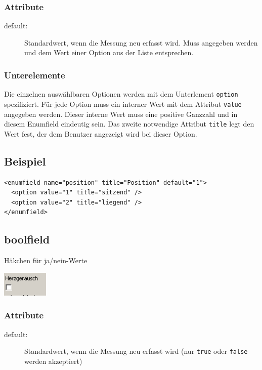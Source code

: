 \documentclass[a4paper]{scrartcl}
\begin{document}
\subsubsection{Attribute}
\begin{description}
    \item[default:] Standardwert, wenn die Messung neu erfasst wird. Muss
                    angegeben werden und dem Wert einer Option aus der Liste
                    entsprechen.
\end{description}
\subsubsection{Unterelemente}
Die einzelnen auswählbaren Optionen werden mit dem Unterlement \texttt{option}
spezifiziert. Für jede Option muss ein interner Wert mit dem Attribut
\texttt{value} angegeben werden. Dieser interne Wert muss eine positive Ganzzahl
und in diesem Enumfield eindeutig sein. Das zweite notwendige Attribut
\texttt{title} legt den Wert fest, der dem Benutzer angezeigt wird bei dieser
Option.
\subsection{Beispiel}
\begin{lstlisting}
<enumfield name="position" title="Position" default="1">
  <option value="1" title="sitzend" />
  <option value="2" title="liegend" />
</enumfield>
\end{lstlisting}


\subsection{boolfield}
Häkchen für ja/nein-Werte
\begin{center}
    \includegraphics[width=2.2cm]{images/boolfield.png}
\end{center}
\subsubsection{Attribute}
\begin{description}
    \item[default:] Standardwert, wenn die Messung neu erfasst wird (nur
                    \texttt{true} oder \texttt{false} werden akzeptiert)
\end{description}
\end{document}
